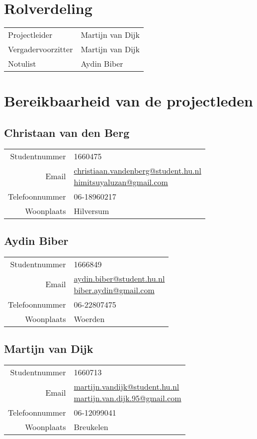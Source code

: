 \documentclass[dutch]{hu}
\subtitle{Teamcontract}
\begin{document}
\maketitle
\newpage

\chapter{Rolverdeling}
\begin{tabular}{l l}
Projectleider & Martijn van Dijk \\
Vergadervoorzitter & Martijn van Dijk \\
Notulist & Aydin Biber
\end{tabular}

\chapter{Bereikbaarheid van de projectleden}
\section*{Christaan van den Berg}
\begin{tabular}{ r | l }
Studentnummer & 1660475 \\
Email & \makecell[l]{
	\href{mailto:christiaan.vandenberg@student.hu.nl}{christiaan.vandenberg@student.hu.nl} \\
	\href{mailto:himitsuyaluzan@gmail.com}{himitsuyaluzan@gmail.com}
	} \\
Telefoonnummer & 06-18960217 \\
Woonplaats & Hilversum
\end{tabular}

\section*{Aydin Biber}
\begin{tabular}{ r | l }
Studentnummer & 1666849 \\
Email & \makecell[l]{
	\href{mailto:aydin.biber@student.hu.nl}{aydin.biber@student.hu.nl} \\ 
	\href{mailto:biber.aydin@gmail.com}{biber.aydin@gmail.com}
	} \\
Telefoonnummer & 06-22807475 \\
Woonplaats & Woerden
\end{tabular}

\section*{Martijn van Dijk}
\begin{tabular}{ r | l }
Studentnummer & 1660713 \\
Email & \makecell[l]{
	\href{mailto:martijn.vandijk@student.hu.nl}{martijn.vandijk@student.hu.nl} \\
	\href{mailto:martijn.van.dijk.95@gmail.com}{martijn.van.dijk.95@gmail.com}
	} \\
Telefoonnummer & 06-12099041 \\
Woonplaats & Breukelen
\end{tabular}
\end{document}
